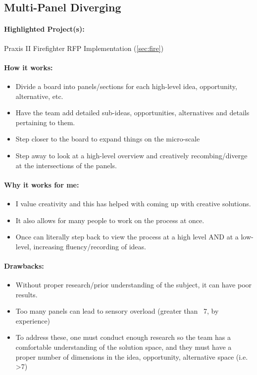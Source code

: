 \documentclass[a4paper,12pt]{article}
\begin{document}
\subsection{Multi-Panel Diverging}
\label{sec:panel}
\paragraph{Highlighted Project(s): } Praxis II Firefighter RFP Implementation (\ref{sec:fire})
\paragraph{How it works: }
\begin{itemize}
	\item Divide a board into panels/sections for each high-level {idea, opportunity, alternative, etc.}
	\item Have the team add detailed sub-{ideas, opportunities, alternatives} and details pertaining to them.
	\item Step closer to the board to expand things on the micro-scale
	\item Step away to look at a high-level overview and creatively recombing/diverge at the intersections of the panels.
\end{itemize}

\paragraph{Why it works for me: }
\begin{itemize}
\item I value creativity and this has helped with coming up with creative solutions.
\item It also allows for many people to work on the process at once. 
\item Once can literally step back to view the process at a high level AND at a low-level, increasing fluency/recording of ideas.
\end{itemize}

\paragraph{Drawbacks: }
\begin{itemize}
	\item Without proper research/prior understanding of the subject, it can have poor results.
	\item Too many panels can lead to sensory overload (greater than ~7, by experience)
	\item To address these, one must conduct enough research so the team has a comfortable understanding of the solution space, and they must have a proper number of dimensions in the {idea, opportunity, alternative} space (i.e. >7)
\end{itemize}
\end{document}

